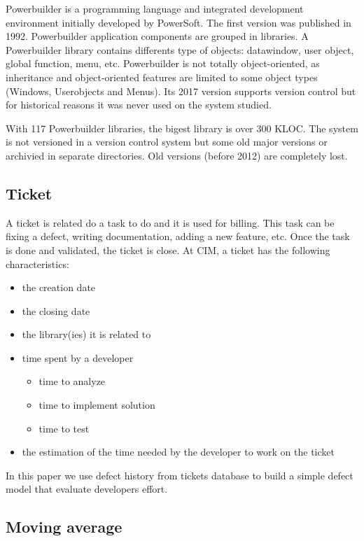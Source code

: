 \documentclass[10pt,conference]{IEEEtran}
\begin{document}
Powerbuilder is a programming language and integrated development environment initially developed by PowerSoft. The first version was published in 1992.
Powerbuilder application components are grouped in libraries.  
A Powerbuilder library contains differents type of objects: datawindow, user object, global function,  menu, etc. 
Powerbuilder is not totally object-oriented, as inheritance and object-oriented features are limited to some object types (Windows, Userobjects and Menus). 
Its 2017 version  supports version control but for historical reasons it was never used on the system studied.%
    

With 117 Powerbuilder libraries, the  bigest library is  over 300 KLOC.
The system is not versioned in a version control system but some old major versions or archivied in separate directories.
Old versions (before 2012) are completely lost.


\subsection{Ticket}

A ticket is related do a task to do and it is used for billing. 
This task can be fixing a defect, writing documentation, adding a new feature, etc. 
Once the task is done and validated, the ticket is close.
At CIM, a ticket has the following characteristics:

\begin{itemize}
\item the creation date
\item the closing date
\item the library(ies) it is related to
\item time spent by a developer
  \begin{itemize}
\item time to analyze
\item time to implement solution
\item time to test
  \end{itemize}
\item  the estimation of the time needed by the developer to work on the ticket
\end{itemize}
In this paper we use defect history  from tickets database to build a simple defect model that evaluate developers effort.

\subsection{Moving average}
\end{document}
